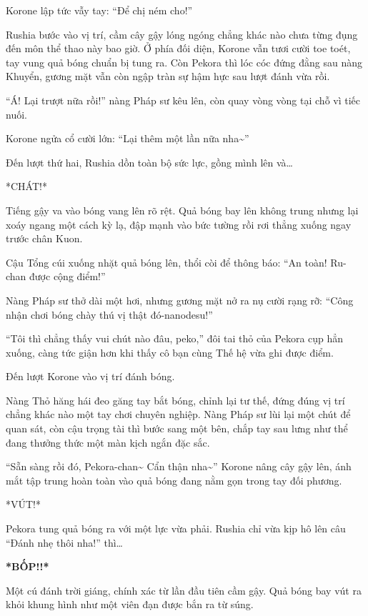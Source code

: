 \documentclass[../main.tex]{subfiles}
\begin{document}
Korone lập tức vẫy tay: ``Để chị ném cho!''

\ct

Rushia bước vào vị trí, cầm cây gậy lóng ngóng chẳng khác nào chưa từng đụng đến môn thể thao này bao giờ. Ở phía đối diện, Korone vẫn tươi cười toe toét, tay vung quả bóng chuẩn bị tung ra. Còn Pekora thì lóc cóc đứng đằng sau nàng Khuyển, gương mặt vẫn còn ngập tràn sự hậm hực sau lượt đánh vừa rồi.

``Á! Lại trượt nữa rồi!'' nàng Pháp sư kêu lên, còn quay vòng vòng tại chỗ vì tiếc nuối.

Korone ngửa cổ cười lớn: ``Lại thêm một lần nữa nha\~{}''

Đến lượt thứ hai, Rushia dồn toàn bộ sức lực, gồng mình lên và\dots

*CHÁT!*

Tiếng gậy va vào bóng vang lên rõ rệt. Quả bóng bay lên không trung nhưng lại xoáy ngang một cách kỳ lạ, đập mạnh vào bức tường rồi rơi thẳng xuống ngay trước chân Kuon.

Cậu Tổng cúi xuống nhặt quả bóng lên, thổi còi để thông báo: ``An toàn! Ru-chan được cộng điểm!''

Nàng Pháp sư thở dài một hơi, nhưng gương mặt nở ra nụ cười rạng rỡ: ``Công nhận chơi bóng chày thú vị thật đó-nanodesu!''

``Tôi thì chẳng thấy vui chút nào đâu, peko,'' đôi tai thỏ của Pekora cụp hẳn xuống, càng tức giận hơn khi thấy cô bạn cùng Thế hệ vừa ghi được điểm.

\ct

Đến lượt Korone vào vị trí đánh bóng.

Nàng Thỏ hăng hái đeo găng tay bắt bóng, chỉnh lại tư thế, đứng đúng vị trí chẳng khác nào một tay chơi chuyên nghiệp. Nàng Pháp sư lùi lại một chút để quan sát, còn cậu trọng tài thì bước sang một bên, chắp tay sau lưng như thể đang thưởng thức một màn kịch ngắn đặc sắc.

``Sẵn sàng rồi đó, Pekora-chan\~{} Cẩn thận nha\~{}'' Korone nâng cây gậy lên, ánh mắt tập trung hoàn toàn vào quả bóng đang nằm gọn trong tay đối phương.

*VÚT!*

Pekora tung quả bóng ra với một lực vừa phải. Rushia chỉ vừa kịp hô lên câu ``Đánh nhẹ thôi nha!'' thì\dots

\textbf{*BỐP!!*}

Một cú đánh trời giáng, chính xác từ lần đầu tiên cầm gậy. Quả bóng bay vút ra khỏi khung hình như một viên đạn được bắn ra từ súng.
\end{document}
